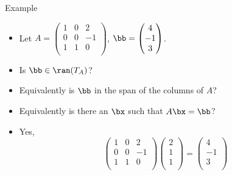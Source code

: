 \documentclass{beamer}
\begin{document}

\begin{frame}{Example}

\begin{itemize}
\item Let
$A=
\begin{pmatrix}
1 & 0 &  2 \\
0 & 0 & -1 \\
1 & 1 &  0 \\
\end{pmatrix}
$,
$\bb=
\begin{pmatrix}
 4 \\
-1 \\
 3 \\
\end{pmatrix}
$.
\item Is $\bb\in\ran(T_A)$?
\item Equivalently is $\bb$ in the span of the columns of $A$?
\item Equivalently is there an $\bx$ such that $A\bx=\bb$?
\item Yes,
$$
\begin{pmatrix}
1 & 0 &  2 \\
0 & 0 & -1 \\
1 & 1 &  0 \\
\end{pmatrix}
\begin{pmatrix}
 2 \\
 1 \\
 1 \\
\end{pmatrix}
=
\begin{pmatrix}
 4 \\
-1 \\
 3 \\
\end{pmatrix}
$$
\end{itemize}

\end{frame}

\end{document}
